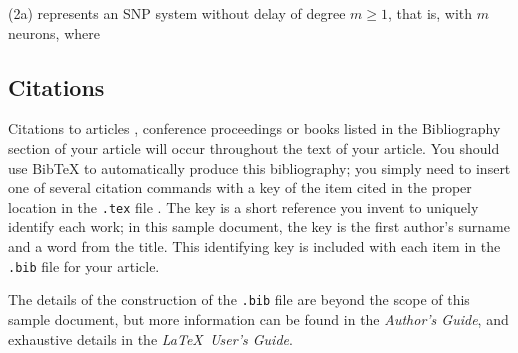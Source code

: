 \documentclass{acm_proc_article-sp}
\begin{document}

(2a) represents an SNP system without delay of degree $m \ge 1$, that is, with $m$ neurons, where






\subsection{Citations}
Citations to articles \cite{bowman:reasoning, clark:pct, braams:babel, herlihy:methodology},
conference
proceedings \cite{clark:pct} or books \cite{salas:calculus, Lamport:LaTeX} listed
in the Bibliography section of your
article will occur throughout the text of your article.
You should use BibTeX to automatically produce this bibliography;
you simply need to insert one of several citation commands with
a key of the item cited in the proper location in
the \texttt{.tex} file \cite{Lamport:LaTeX}.
The key is a short reference you invent to uniquely
identify each work; in this sample document, the key is
the first author's surname and a
word from the title.  This identifying key is included
with each item in the \texttt{.bib} file for your article.

The details of the construction of the \texttt{.bib} file
are beyond the scope of this sample document, but more
information can be found in the \textit{Author's Guide},
and exhaustive details in the \textit{\LaTeX\ User's
Guide}\cite{Lamport:LaTeX}.
\end{document}
